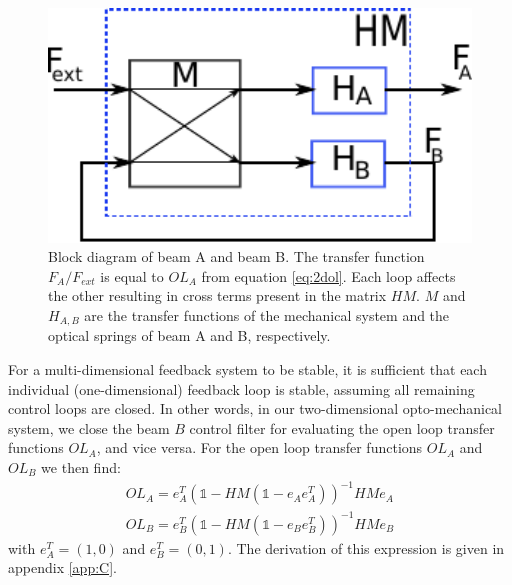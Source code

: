 \begin{figure}[htbp]
		\includegraphics[width=15cm]{./figures/block_mimo_paper.pdf}
	\caption[Block Diagram of Optical Trap Beams]{Block diagram of beam A and beam B. The transfer function $F_A/F_{ext}$ is equal to $OL_A$ from equation \ref{eq:2dol}. Each loop affects the other resulting in cross terms
	present in the matrix $HM$. $M$ and $H_{A,B}$ are the transfer functions of the mechanical system and the optical springs of beam A and B, respectively.}
	\label{fig:block_loops}
\end{figure}


For a multi-dimensional feedback system to be stable, it is sufficient that each individual (one-dimensional) feedback loop is stable, assuming all remaining control loops are closed. In other words, in our two-dimensional opto-mechanical system, we close the beam $B$ control filter for evaluating the open loop transfer functions $OL_{A}$, and vice versa. For the open loop transfer functions $OL_{A}$ and $OL_{B}$ we then find: 
\begin{eqnarray}
\label{eq:2dol}
OL_{A}=e_A^{T}\left(\mathds{1}-HM (\mathds{1} - e_A e_A^T) \right)^{-1}HMe_A  \\
OL_{B}=e_B^{T}\left(\mathds{1}-HM (\mathds{1} - e_B e_B^T) \right)^{-1}HMe_B \nonumber
\end{eqnarray}
with $e_A^T=(1,0)$ and $e_B^T=(0,1)$. The derivation of this expression is given in appendix \ref{app:C}.



